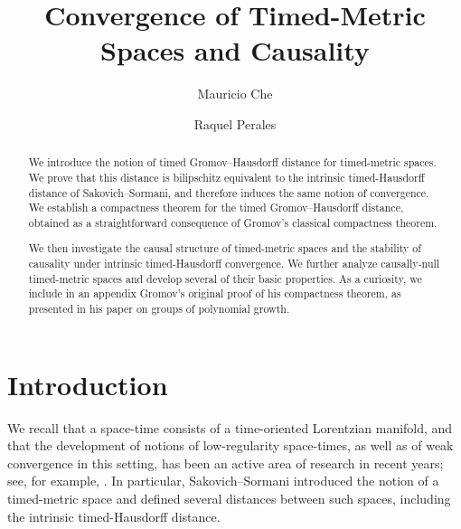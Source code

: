 \documentclass[a4paper,12pt,reqno]{amsart}
\title[Convergence of Timed-Metric Spaces and Causality]{Convergence of Timed-Metric Spaces and Causality}
\author[Che]{Mauricio Che}
\author[Perales]{Raquel Perales}
\theoremstyle{plain}
\begin{document}
\begin{abstract}  
We introduce the notion of timed Gromov–Hausdorff distance for timed-metric spaces. We prove that this distance is bilipschitz equivalent to the intrinsic timed-Hausdorff distance of Sakovich–Sormani, and therefore induces the same notion of convergence. We establish a compactness theorem for the timed Gromov–Hausdorff distance, obtained as a straightforward consequence of Gromov’s classical compactness theorem.

We then investigate the causal structure of timed-metric spaces and the stability of causality under intrinsic timed-Hausdorff convergence. We further analyze causally-null timed-metric spaces and develop several of their basic properties. As a curiosity, we include in an appendix Gromov’s original proof of his compactness theorem, as presented in his paper on groups of polynomial growth.
\end{abstract}


\maketitle
{
\hypersetup{linkcolor=blue}
\setcounter{tocdepth}{1}
\tableofcontents
}

\section{Introduction}\label{sec:intro}


We recall that a space-time consists of a time-oriented Lorentzian manifold, and that the development of notions of low-regularity space-times, as well as of weak convergence in this setting, has been an active area of research in recent years; see, for example, \cite{Kunzinger-Saemann,Minguzzi-Suhr-24,Cavalletti-Mondino,Cavalletti-Manini-Mondino-Optimal}. In particular, Sakovich--Sormani introduced the notion of a timed-metric space \cite{SakSor-Notions} and defined several distances between such spaces, including the intrinsic timed-Hausdorff distance.
\end{document}
